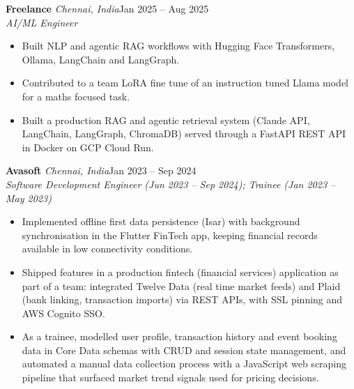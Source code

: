 \documentclass[a4paper,11pt]{article}
\newcommand{\role}[4]{%
  \textbf{#1}{\color{muted}\,\textperiodcentered\,\textit{#2}}\hfill{\color{muted}#3}\\
  \textit{#4}\par}
\newcommand{\gap}{\vspace{5pt}}
\begin{document}
\gap
{}
\role{Freelance}{Chennai, India}{Jan 2025 – Aug 2025}{AI/ML Engineer}
\begin{itemize}
  \item Built NLP and agentic RAG workflows with Hugging Face Transformers, Ollama, LangChain and LangGraph.
  \item Contributed to a team LoRA fine tune of an instruction tuned Llama model for a maths focused task.
  \item Built a production RAG and agentic retrieval system (Claude API, LangChain, LangGraph, ChromaDB) served through a FastAPI REST API in Docker on GCP Cloud Run.
\end{itemize}
\gap
{}
\role{Avasoft}{Chennai, India}{Jan 2023 – Sep 2024}{Software Development Engineer (Jun 2023 – Sep 2024); Trainee (Jan 2023 – May 2023)}
\begin{itemize}
  \item Implemented offline first data persistence (Isar) with background synchronisation in the Flutter FinTech app, keeping financial records available in low connectivity conditions.
  \item Shipped features in a production fintech (financial services) application as part of a team: integrated Twelve Data (real time market feeds) and Plaid (bank linking, transaction imports) via REST APIs, with SSL pinning and AWS Cognito SSO.
  \item As a trainee, modelled user profile, transaction history and event booking data in Core Data schemas with CRUD and session state management, and automated a manual data collection process with a JavaScript web scraping pipeline that surfaced market trend signals used for pricing decisions.
\end{itemize}
\end{document}
